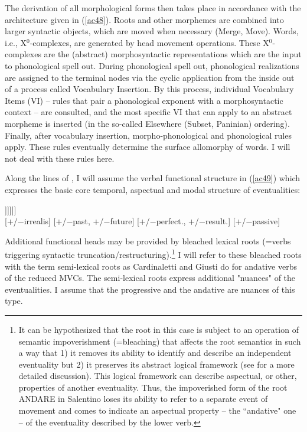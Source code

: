 \documentclass[output=paper]{langscibook}
\begin{document}
The derivation of all morphological forms then takes place in accordance with the architecture given in (\ref{ac48}). Roots and other morphemes are combined into larger syntactic objects, which are moved when necessary (Merge, Move). Words, i.e., X$^0$-complexes, are generated by head movement operations. These X$^0$-complexes are the (abstract) morphosyntactic representations which are the input to phonological spell out.  During phonological spell out, phonological realizations are assigned to the terminal nodes via the cyclic application from the inside out of a process called Vocabulary Insertion. By this process, individual Vocabulary Items (VI)  --  rules that pair a phonological exponent with a morphosyntactic context -- are consulted, and the most specific VI that can apply to an abstract morpheme is inserted (in the so-called Elsewhere (Subset, Paninian) ordering).  Finally, after vocabulary insertion, morpho-phonological and phonological rules apply.  These rules eventually determine the surface allomorphy of words.  I will not deal with these rules here.

Along the lines of \citet{wurmbrand2015}, I will assume the verbal functional structure in (\ref{ac49}) which expresses the basic core temporal, aspectual and modal structure of eventualities:

\ea \label{ac49}
\gll [\textsubscript{MoodP} Mood$^0$ [\textsubscript{TenseP} T$^0$ [\textsubscript{AspP} Asp$^0$ [\textsubscript{VoiceP} Voice$^0$ [\textsubscript{vP} v$^0$ [\textsubscript{√p} √Root$^0$ ]]]]]]\\
     {} [+/−irrealis] {} {[+/−past, +/−future]} {}  {[+/−perfect., +/−result.]} {} [+/−passive] {} {} {} {} {}\\
\z

Additional functional heads may be provided by bleached lexical roots (=verbs triggering syntactic truncation/restructuring).\footnote{It can be hypothesized that the root in this case is subject to an operation of semantic impoverishment (=bleaching) that affects the root semantics in such a way that 1) it removes its ability to identify and describe an independent eventuality but 2) it preserves its abstract logical framework (see \cite{roberts2010a} for a more detailed discussion).  This logical framework can describe aspectual, or other, properties of another eventuality.  Thus, the impoverished form of the root ANDARE in Salentino loses its ability to refer to a separate event of movement and comes to indicate an aspectual property -- the “andative" one -- of the eventuality described by the lower verb.}  I will refer to these bleached roots with the term semi-lexical roots as Cardinaletti and Giusti do for andative verbs of the reduced MVCs. The semi-lexical roots express additional "nuances" of the eventualities.   I assume that the progressive and the andative are nuances of this type.
\end{document}
